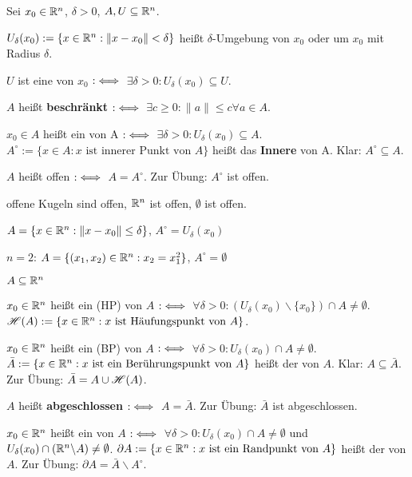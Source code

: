 \documentclass[a4paper,twoside,DIV15,BCOR12mm,chapterprefix=true,headings=twolinechapter]{scrbook}
\begin{document}
\begin{definition}
Sei $x_0 \in \mathbb{R}^n$, $\delta > 0$, $A, U\subseteq \mathbb{R}^n$.
\begin{liste}
 \item $U_\delta(x_0) := \{ x \in \mathbb{R}^n: \|x-x_0\|<\delta\}$ heißt $\delta$-Umgebung von $x_0$ oder  um $x_0$ mit Radius $\delta$.
 \item $U$ ist eine  von $x_0$ $:\iff$ $\exists \delta > 0 : U_\delta(x_0) \subseteq U$.
 \item {}$A$ heißt \textbf{beschränkt} $:\iff$ $\exists c \ge 0: \|a\|\le c \forall a\in A$.
 \item $x_0\in A$ heißt ein  von A $:\iff$ $\exists \delta>0: U_\delta(x_0) \subseteq A$. \\
   $A^\circ:=\{ x\in A: x \text{ ist innerer Punkt von }A\}$ heißt das \textbf{Innere} von A. Klar: $A^\circ\subseteq A.$
 \item $A$ heißt offen $:\iff$ $A=A^\circ$. Zur Übung: $A^\circ$ ist offen.
\end{liste}
\end{definition}

\begin{beispiele}
 \item offene Kugeln sind offen, $\mathbb{R}^n$ ist offen, $\emptyset$ ist offen.
 \item $A=\{x\in\mathbb{R}^n: \|x-x_0\|\le \delta\}$, $A^\circ = U_\delta(x_0)$
 \item $n=2$: $A=\{(x_1,x_2)\in\mathbb{R}^n: x_2 = x_1^2\}$, $A^\circ=\emptyset$
\end{beispiele}

\begin{definition}
 $A\subseteq \mathbb{R}^n$
 \begin{liste}
 \item $x_0\in \mathbb{R}^n$ heißt ein  (HP) von $A$ $:\iff$ $\forall \delta > 0: (U_\delta(x_0) \backslash \{x_0\}) \cap A \ne \emptyset$. $\mathscr{H}(A) := \{ x\in\mathbb{R}^n: x \text{ ist Häufungspunkt von } A\}$.
 \item  $x_0\in\mathbb{R}^n$ heißt ein  (BP) von $A$ $:\iff$ $\forall\delta>0: U_\delta(x_0) \cap A \ne \emptyset$. $\bar{A}:=\{x\in\mathbb{R}^n: x \text{ ist ein Berührungspunkt von } A\}$ heißt der  von $A$. Klar: $A\subseteq\bar{A}$. Zur Übung: $\bar{A} = A \cup \mathscr{H}(A)$.
 \item {}$A$ heißt \textbf{abgeschlossen} $:\iff$ $A=\bar{A}$. Zur Übung: $\bar{A}$ ist abgeschlossen.
 \item $x_0\in\mathbb{R}^n$ heißt ein  von $A$ $:\iff$ $\forall\delta>0: U_\delta(x_0) \cap A \ne \emptyset$ und $U_\delta(x_0) \cap (\mathbb{R}^n\backslash A) \ne \emptyset$. $\partial A := \{x\in\mathbb{R}^n: x \text{ ist ein Randpunkt von } A \}$ heißt der  von $A$. Zur Übung: $\partial A = \bar{A}\backslash A^\circ$.
 \end{liste}
\end{definition}
\end{document}
